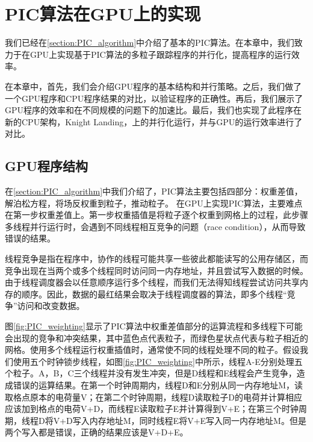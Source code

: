 
\chapter{PIC算法在GPU上的实现}
\label{chap:PIC_GPU}

我们已经在\ref{section:PIC_algorithm}中介绍了基本的PIC算法。在本章中，我们致力于在GPU上实现基于PIC算法的多粒子跟踪程序的并行化，提高程序的运行效率。

在本章中，首先，我们会介绍GPU程序的基本结构和并行策略。之后，我们做了一个GPU程序和CPU程序结果的对比，以验证程序的正确性。再后，我们展示了GPU程序的效率和在不同规模的问题下的加速比。最后，我们也实现了此程序在新的CPU架构，Knight Landing，上的并行化运行，并与GPU的运行效率进行了对比。

\section{GPU程序结构}
在\ref{section:PIC_algorithm}中我们介绍了，PIC算法主要包括四部分：权重差值，解泊松方程，将场反权重到粒子，推动粒子。
在GPU上实现PIC算法，主要难点在第一步权重差值上。第一步权重插值是将粒子逐个权重到网格上的过程，此步骤多线程并行运行时，会遇到不同线程相互竞争的问题（race condition），从而导致错误的结果。

线程竞争是指在程序中，协作的线程可能共享一些彼此都能读写的公用存储区，而竞争出现在当两个或多个线程同时访问同一内存地址，并且尝试写入数据的时候。由于线程调度器会以任意顺序运行多个线程，而我们无法得知线程尝试访问共享内存的顺序。因此，数据的最红结果会取决于线程调度器的算法，即多个线程“竞争”访问和改变数据。

图\ref{fig:PIC_weighting}显示了PIC算法中权重差值部分的运算流程和多线程下可能会出现的竞争和冲突结果，其中蓝色点代表粒子，而绿色星状点代表与粒子相近的网格。使用多个线程运行权重插值时，通常使不同的线程处理不同的粒子。假设我们使用五个时钟锁步线程，如图\ref{fig:PIC_weighting}中所示，线程A-E分别处理五个粒子。A，B，C三个线程并没有发生冲突，但是D线程和E线程会产生竞争，造成错误的运算结果。在第一个时钟周期内，线程D和E分别从同一内存地址M，读取格点原本的电荷量V；在第二个时钟周期，线程D读取粒子D的电荷并计算相应应该加到格点的电荷V+D，而线程E读取粒子E并计算得到V+E；在第三个时钟周期，线程D将V+D写入内存地址M，同时线程E将V+E写入同一内存地址M。但是两个写入都是错误，正确的结果应该是V+D+E。

